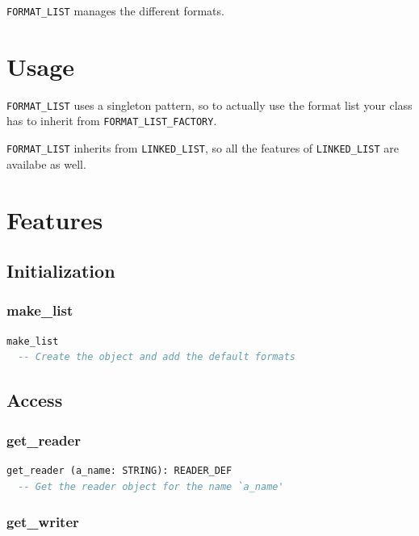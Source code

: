 \texttt{FORMAT\_LIST} manages the different formats.


\section{Usage}
\label{management-usage}

\texttt{FORMAT\_LIST} uses a singleton pattern, so to actually use the
format list your class has to inherit from
\texttt{FORMAT\_LIST\_FACTORY}.

\texttt{FORMAT\_LIST} inherits from \texttt{LINKED\_LIST}, so all the
features of \texttt{LINKED\_LIST} are availabe as well.


\section{Features}
\label{sec:management-features}


\subsection{Initialization}
\label{sec:management-initialization}

\subsubsection{make\_list}

\begin{lstlisting}[language=Eiffel]
make_list
  -- Create the object and add the default formats
\end{lstlisting}

\newpage

\subsection{Access}
\label{sec:management-access}

\subsubsection{get\_reader}

\begin{lstlisting}[language=Eiffel]
get_reader (a_name: STRING): READER_DEF
  -- Get the reader object for the name `a_name'
\end{lstlisting}

\subsubsection{get\_writer}


